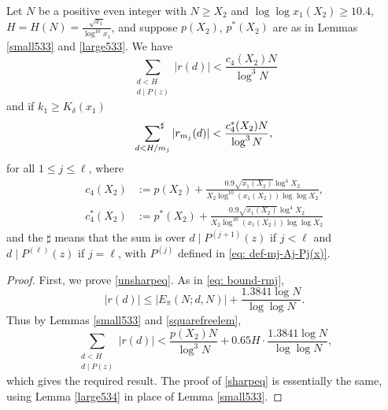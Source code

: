 \documentclass[12pt]{amsart}
\begin{document}
\begin{lemma}\label{544small}
    Let $N$ be a positive even integer with $N \ge X_2$ and $\log\log x_1(X_2)\ge 10.4$, $H=H(N)=\frac{\sqrt{x_1}}{\log^{10}x_1}$, and suppose $p(X_2)$, $p^*(X_2)$ are as in Lemmas \ref{small533} and \ref{large533}. We have
    \begin{equation}\label{unsharpeq}
        \sum_{\substack{d<H\\d\mid P(z)}}|r(d)|<\frac{c_4(X_2)N}{\log^3 N}
    \end{equation}
    and if $k_1\ge K_{\delta}(x_1)$
    \begin{equation}\label{sharpeq}
         \sideset{}{^\sharp}\sum_{\substack{d<H/m_j}}|r_{m_j}(d)|<\frac{c_4^*(X_2)N}{\log^3N},
    \end{equation}
    for all $1 \le j \le \ell$, where
    \begin{align}
        c_4(X_2)&:=p(X_2)+\frac{0.9\sqrt{x_1(X_2)}\log^{4}X_2}{X_2\log^{10}(x_1(X_2))\log\log X_2},\label{eq: def-c-4}\\
        c_4^*(X_2)&:=p^*(X_2)+\frac{0.9\sqrt{x_1(X_2)}\log^{4}X_2}{X_2\log^{10}(x_1(X_2))\log\log X_2} \label{eq: def-c-4-*}
    \end{align}
    and the $\sharp$ means that the sum is over $d\mid P^{(j+1)}(z)$ if $j<\ell$ and $d\mid P^{(\ell)}(z)$ if $j=\ell$, with $P^{(j)}$ defined in \eqref{eq: def-mj-Aj-Pj(x)}.
\end{lemma}
\begin{proof}
    First, we prove \eqref{unsharpeq}. As in \eqref{eq: bound-rmj},
    \begin{equation*}
        |r(d)|\le|E_{\pi}(N; d, N)| + \frac{1.3841 \log N}{\log \log N}.\label{rdineq}
    \end{equation*}
    Thus by Lemmas \ref{small533} and \ref{squarefreelem},
    \begin{equation*}
        \sum_{\substack{d<H\\d\mid P(z)}}|r(d)|<\frac{p(X_2)N}{\log^3 N}+0.65H\cdot\frac{1.3841\log N}{\log\log N},
    \end{equation*}
    which gives the required result. The proof of \eqref{sharpeq} is essentially the same, using Lemma \ref{large534} in place of Lemma \ref{small533}.
\end{proof}
\end{document}
